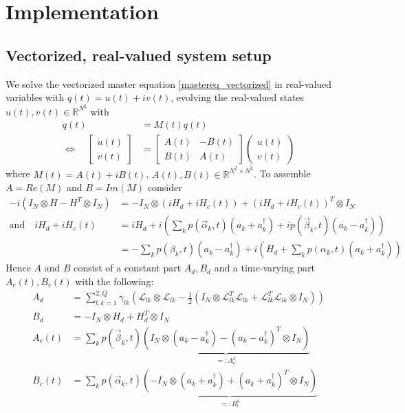 \documentclass[letterpaper]{article}
\newcommand{\Ell}{\mathcal{L}}
\newcommand{\R}{\mathds{R}}
\begin{document}
\section{Implementation}
  \subsection{Vectorized, real-valued system setup}
   We solve the vectorized master equation \eqref{mastereq_vectorized} in real-valued variables with $q(t) = u(t) + iv(t)$, evolving the real-valued states $u(t), v(t)\in \R^{N^2}$ with
   \begin{align}
     \dot q(t) &= M(t) q(t) \\
   \Leftrightarrow \quad \begin{bmatrix} \dot u(t) \\ \dot v(t) \end{bmatrix} &= 
   \begin{bmatrix} A(t) & -B(t) \\ B(t) & A(t) \end{bmatrix} \begin{pmatrix} u(t) \\ v(t) \end{pmatrix} \label{realvaluedODE}
   \end{align}
   where $M(t) = A(t) + i B(t)$, $A(t), B(t)\in \R^{N^2\times N^2}$. To assemble $A = Re(M)$ and $B = Im(M)$ consider
   \begin{align}
     -i(I_N \otimes H - H^T \otimes I_N) &= -I_N \otimes \left(iH_d + iH_c(t)\right) + \left(iH_d + iH_c(t)\right)^T \otimes I_N \\
     \text{and} \quad iH_d + iH_c(t) &= i H_d + i\left( \sum_k p(\vec{\alpha}_k,t)(a_k + a_k^{\dagger}) + ip(\vec{\beta}_k,t)(a_k - a_k^{\dagger})\right) \\
                    &= - \sum_k p(\beta_k,t)(a_k - a_k^{\dagger}) + i\left( H_d + \sum_k p(\alpha_k,t)(a_k+a_k^{\dagger}) \right) 
   \end{align}
   Hence $A$ and $B$ consist of a constant part $A_d, B_d$ and a time-varying part $A_c(t), B_c(t)$ with the following:
   \begin{align}
     A_d &=  \sum_{l,k=1}^{2,Q}\gamma_{lk} \left( \Ell_{lk}\otimes\Ell_{lk} - \frac 1 2 \left(I_N \otimes \Ell_{lk}^T\Ell_{lk} + \Ell_{lk}^T\Ell_{lk}\otimes I_N\right) \right)\\
     B_d &= -I_N \otimes H_d + H_d^T \otimes I_N \\
     A_c(t) &= \sum_k p(\vec{\beta}_k,t) \underbrace{\left( I_N \otimes \left(a_k - a_k^{\dagger}\right) - \left(a_k - a_k^{\dagger}\right)^T\otimes I_N \right)}_{=:A_c^k} \\
     B_c(t) &= \sum_k p(\vec{\alpha}_k,t) \underbrace{\left( - I_N \otimes \left(a_k + a_k^{\dagger}\right) + \left(a_k + a_k^{\dagger}\right)^T\otimes I_N \right)}_{=:B_c^k} 
   \end{align}
\end{document}
